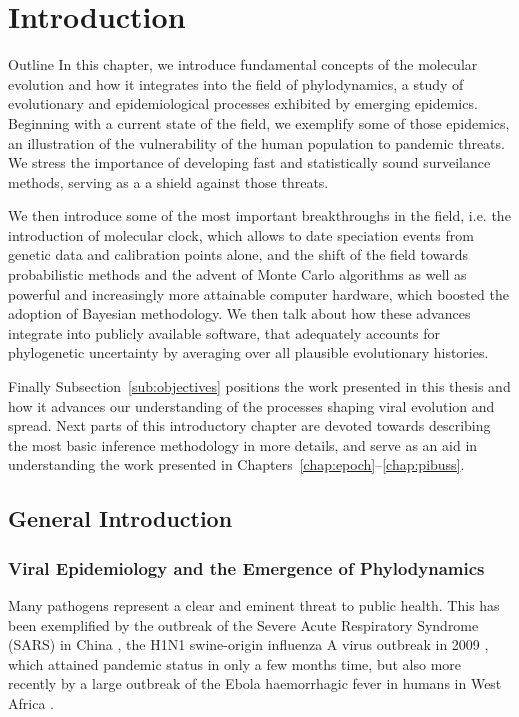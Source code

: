 \chapter{Introduction}

\begin{remark}{Outline}
In this chapter, we introduce fundamental concepts of the molecular evolution and how it integrates into the field of phylodynamics, a study of evolutionary and epidemiological processes exhibited by emerging epidemics.
Beginning with a current state of the field, we exemplify some of those epidemics, an illustration of the vulnerability of the human population to pandemic threats.
We stress the importance of developing fast and statistically sound surveilance methods, serving as a a shield against those threats.

We then introduce some of the most important breakthroughs in the field, i.e. the introduction of molecular clock, which allows to date speciation events from genetic data and calibration points alone, and the shift of the field towards probabilistic methods and the advent of Monte Carlo algorithms as well as powerful and increasingly more attainable computer hardware, which boosted the adoption of Bayesian methodology.
We then talk about how these advances integrate into publicly available software, that adequately accounts for phylogenetic uncertainty by averaging over all plausible evolutionary histories.

Finally Subsection~\ref{sub:objectives} positions the work presented in this thesis and how it advances our understanding of the processes shaping viral evolution and spread.
Next parts of this introductory chapter are devoted towards describing the most basic inference methodology in more details, and serve as an aid in understanding the work presented in Chapters~\ref{chap:epoch}--\ref{chap:pibuss}.
\end{remark}

\section{General Introduction}

\subsection{Viral Epidemiology and the Emergence of Phylodynamics\label{sub:epidemiology}}

Many pathogens represent a clear and eminent threat to public health. 
This has been exemplified by 
the outbreak of the Severe Acute Respiratory Syndrome (SARS) in China \citep{Ksiazek2003},
the H1N1 swine-origin influenza A virus outbreak in 2009 \citep{Fraser2009},
which attained pandemic status in only a few months time, but also more recently by a large outbreak of the Ebola haemorrhagic fever in humans in West Africa \citep{Dudas2014}. 

